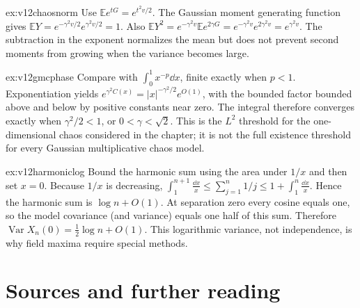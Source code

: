 \begin{solution}{ex:v12chaosnorm}
\idea Use $\mathbb Ee^{tG}=e^{t^2v/2}$.
\writeup The Gaussian moment generating function gives $\mathbb EY=e^{-\gamma^2v/2}e^{\gamma^2v/2}=1$. Also $\mathbb EY^2=e^{-\gamma^2v}\mathbb Ee^{2\gamma G}=e^{-\gamma^2v}e^{2\gamma^2v}=e^{\gamma^2v}$. The subtraction in the exponent normalizes the mean but does not prevent second moments from growing when the variance becomes large.
\end{solution}

\begin{solution}{ex:v12gmcphase}
\idea Compare with $\int_0^1x^{-p}\dd x$, finite exactly when $p<1$.
\writeup Exponentiation yields $e^{\gamma^2C(x)}=|x|^{-\gamma^2/2}e^{O(1)}$, with the bounded factor bounded above and below by positive constants near zero. The integral therefore converges exactly when $\gamma^2/2<1$, or $0<\gamma<\sqrt2$. This is the $L^2$ threshold for the one-dimensional chaos considered in the chapter; it is not the full existence threshold for every Gaussian multiplicative chaos model.
\end{solution}

\begin{solution}{ex:v12harmoniclog}
\idea Bound the harmonic sum using the area under $1/x$ and then set $x=0$.
\writeup Because $1/x$ is decreasing, $\int_1^{n+1}\frac{\dd x}{x}\le\sum_{j=1}^n1/j\le1+\int_1^n\frac{\dd x}{x}$. Hence the harmonic sum is $\log n+O(1)$. At separation zero every cosine equals one, so the model covariance (and variance) equals one half of this sum. Therefore $\operatorname{Var}X_n(0)=\frac12\log n+O(1)$. This logarithmic variance, not independence, is why field maxima require special methods.
\end{solution}

\section*{Sources and further reading}

